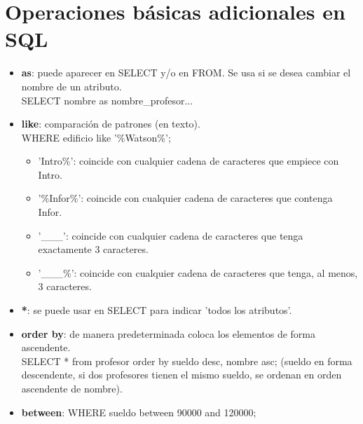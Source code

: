 \documentclass{article}
\begin{document}
\section{Operaciones básicas adicionales en SQL}
\begin{itemize}
    \item \textbf{as}: puede aparecer en SELECT y/o en FROM. Se usa si se desea cambiar el nombre de un atributo. \\
    SELECT nombre as nombre\_profesor...

    \item \textbf{like}: comparación de patrones (en texto). \\
    WHERE edificio like '\%Watson\%'; \\
    \begin{itemize}
        \item 'Intro\%': coincide con cualquier cadena de caracteres que empiece con Intro. 

        \item '\%Infor\%': coincide con cualquier cadena de caracteres que contenga Infor.

        \item '\_\_\_': coincide con cualquier cadena de caracteres que tenga exactamente 3 caracteres.

        \item '\_\_\_\%': coincide con cualquier cadena de caracteres que tenga, al menos, 3 caracteres.
    \end{itemize}

    \item \textbf{*}: se puede usar en SELECT para indicar 'todos los atributos'.

    \item \textbf{order by}: de manera predeterminada coloca los elementos de forma ascendente. \\
    SELECT * from profesor order by sueldo desc, nombre asc; (sueldo en forma descendente, si dos profesores tienen el mismo sueldo, se ordenan en orden ascendente de nombre).

    \item \textbf{between}: WHERE sueldo between 90000 and 120000;
    
\end{itemize}
\end{document}
